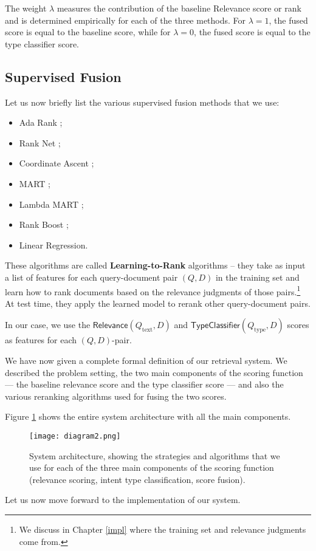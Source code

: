 The weight $\lambda$ measures the contribution of the baseline \textsf{Relevance} score or rank and
is determined empirically for each of the three methods. For $\lambda=1$, the fused score is equal to the baseline score,
while for $\lambda=0$, the fused score is equal to the type classifier score.

\subsection{Supervised Fusion}\label{sup-fusion}
Let us now briefly list the various supervised fusion methods that we use:
\begin{itemize}
 \item {Ada Rank} \cite{adaRank};
 \item {Rank Net} \cite{rankNet};
 \item {Coordinate Ascent} \cite{coordAscent};
 \item {MART} \cite{mart};
 \item {Lambda MART} \cite{lambda-mart};
 \item {Rank Boost} \cite{rankBoost};
  \item {Linear Regression}.
\end{itemize}

These algorithms are called \textbf{Learning-to-Rank} algorithms --
they take as input a list of features for each query-document pair $(Q,D)$ in the training
set and learn how to rank documents based on the
relevance judgments of those pairs.\footnote{We discuss in Chapter \ref{impl} where the training set and relevance judgments come from.}
At test time, they apply the learned model to rerank other query-document pairs.

In our case, we use the $\textsf{Relevance}(Q_{\text{text}},D)$ and $\textsf{TypeClassifier}(Q_{\text{type}}, D)$
scores as features for each $(Q,D)$-pair.

We have now given a complete formal definition of our retrieval system. We described the problem setting,
the two main components of the scoring function --- the baseline relevance score and the type classifier score ---
and also the various reranking algorithms used for fusing the two scores.

Figure \ref{diagram2} shows the entire system architecture with all the main components.

\begin{figure}
\centerline{
  \texttt{[image: diagram2.png]}
  }
  \caption{System architecture, showing the strategies and algorithms that we use for each of the
  three main components of the scoring function (relevance scoring, intent type classification, score fusion).}
  \label{diagram2}
\end{figure}

Let us now move forward to the implementation of our system.


